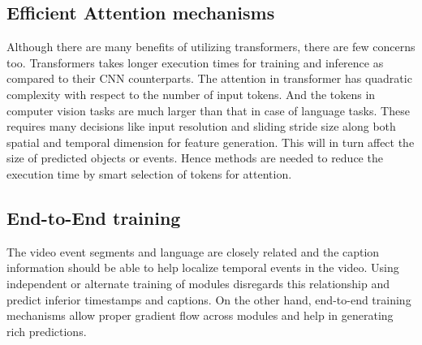 \subsection{Efficient Attention mechanisms}
\par Although there are many benefits of utilizing transformers, there are few concerns too. Transformers takes longer execution times for training and inference as compared to their CNN counterparts. The attention in transformer has quadratic complexity with respect to the number of input tokens. And the tokens in computer vision tasks are much larger than that in case of language tasks. These requires many decisions like input resolution and sliding stride size along both spatial and temporal dimension for feature generation. This will in turn affect the size of predicted objects or events. Hence methods are needed to reduce the execution time by smart selection of tokens for attention.

\subsection{End-to-End training}
\par The video event segments and language are closely related and the caption information should be able to help localize temporal events in the video. Using independent or alternate training of modules disregards this relationship and predict inferior timestamps and captions. On the other hand, end-to-end training mechanisms allow proper gradient flow across modules and help in generating rich predictions.

